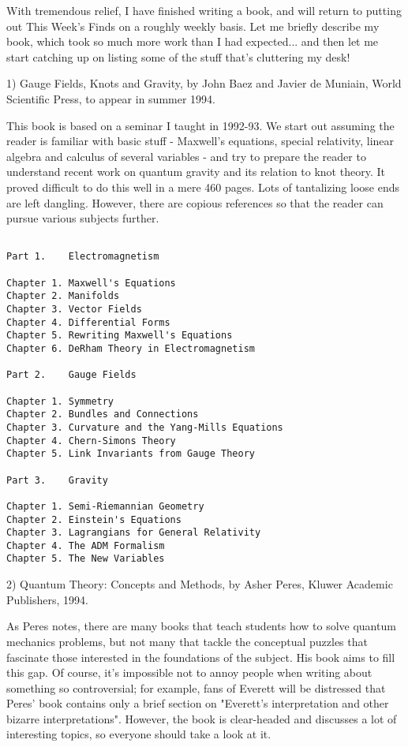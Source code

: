 

With tremendous relief, I have finished writing a book, and will return
to putting out This Week's Finds on a roughly weekly basis.  Let me
briefly describe my book, which took so much more work than I had
expected...  and then let me start catching up on listing some of the
stuff that's cluttering my desk!

1)  Gauge Fields, Knots and Gravity, by John Baez and Javier de
Muniain, World Scientific Press, to appear in summer 1994.

This book is based on a seminar I taught in 1992-93.  We start out
assuming the reader is familiar with basic stuff - Maxwell's
equations, special relativity, linear algebra and calculus of several
variables - and try to prepare the reader to understand recent work on
quantum gravity and its relation to knot theory.  It proved difficult to
do this well in a mere 460 pages.  Lots of tantalizing loose ends are
left dangling.  However, there are copious references so that the reader
can pursue various subjects further.


\begin{verbatim}

Part 1.    Electromagnetism 

Chapter 1. Maxwell's Equations 
Chapter 2. Manifolds
Chapter 3. Vector Fields
Chapter 4. Differential Forms
Chapter 5. Rewriting Maxwell's Equations
Chapter 6. DeRham Theory in Electromagnetism

Part 2.    Gauge Fields

Chapter 1. Symmetry
Chapter 2. Bundles and Connections
Chapter 3. Curvature and the Yang-Mills Equations
Chapter 4. Chern-Simons Theory
Chapter 5. Link Invariants from Gauge Theory

Part 3.    Gravity

Chapter 1. Semi-Riemannian Geometry
Chapter 2. Einstein's Equations
Chapter 3. Lagrangians for General Relativity
Chapter 4. The ADM Formalism
Chapter 5. The New Variables
\end{verbatim}
    

2) Quantum Theory: Concepts and Methods, by Asher Peres, 
Kluwer Academic Publishers, 1994.

As Peres notes, there are many books that teach students how to solve
quantum mechanics problems, but not many that tackle the conceptual
puzzles that fascinate those interested in the foundations of the
subject.  His book aims to fill this gap.  Of course, it's impossible
not to annoy people when writing about something so controversial; for
example, fans of Everett will be distressed that Peres' book contains
only a brief section on "Everett's interpretation and other bizarre
interpretations".  However, the book is clear-headed and discusses a
lot of interesting topics, so everyone should take a look at it.  

